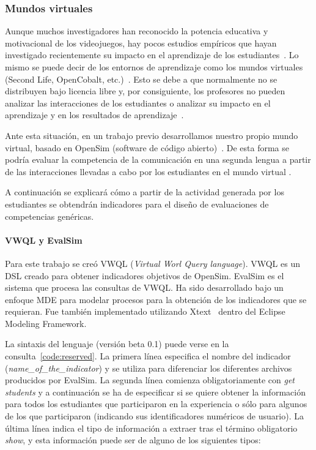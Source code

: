\subsubsection{Mundos virtuales}

Aunque muchos investigadores han reconocido la potencia educativa y motivacional de los videojuegos, hay pocos estudios empíricos que hayan investigado recientemente su impacto en el aprendizaje de los estudiantes~\cite{berns2013game}. Lo mismo se puede decir de los entornos de aprendizaje como los mundos virtuales (Second Life, OpenCobalt, etc.)~\cite{hew2010use}. Esto se debe a que normalmente no se distribuyen bajo licencia libre y, por consiguiente, los profesores no pueden analizar las interacciones de los estudiantes o analizar su impacto en el aprendizaje y en los resultados de aprendizaje~\cite{cruz2015discovering,moreno2014serious}. 

Ante esta situación, en un trabajo previo desarrollamos nuestro propio mundo virtual, basado en OpenSim (software de código abierto)~\cite{berns2013using}. De esta forma se podría evaluar la competencia de la comunicación en una segunda lengua a partir de las interacciones llevadas a cabo por los estudiantes en el mundo virtual . 

A continuación se explicará cómo a partir de la actividad generada por los estudiantes se obtendrán indicadores para el diseño de evaluaciones de competencias genéricas.

\paragraph{VWQL y EvalSim}

Para este trabajo se creó VWQL (\emph{Virtual Worl Query language}). VWQL es un DSL creado para obtener indicadores objetivos de OpenSim. EvalSim es el sistema que procesa las consultas de VWQL. Ha sido desarrollado bajo un enfoque MDE para modelar procesos para la obtención de los indicadores que se requieran. Fue también implementado utilizando Xtext~\cite{eysholdt2010xtext} dentro del Eclipse Modeling Framework.

La sintaxis del lenguaje (versión beta 0.1) puede verse en la consulta~\ref{code:reserved}. La primera línea especifica el nombre del indicador (\emph{name\_of\_the\_indicator}) y se utiliza para diferenciar los diferentes archivos producidos por EvalSim. La segunda línea comienza obligatoriamente con \emph{get students} y a continuación se ha de especificar si se quiere obtener la información para todos los estudiantes que participaron en la experiencia o sólo para algunos de los que participaron (indicando sus identificadores numéricos de usuario). La última línea indica el tipo de información a extraer tras el término obligatorio \emph{show}, y esta información puede ser de alguno de los siguientes tipos:

